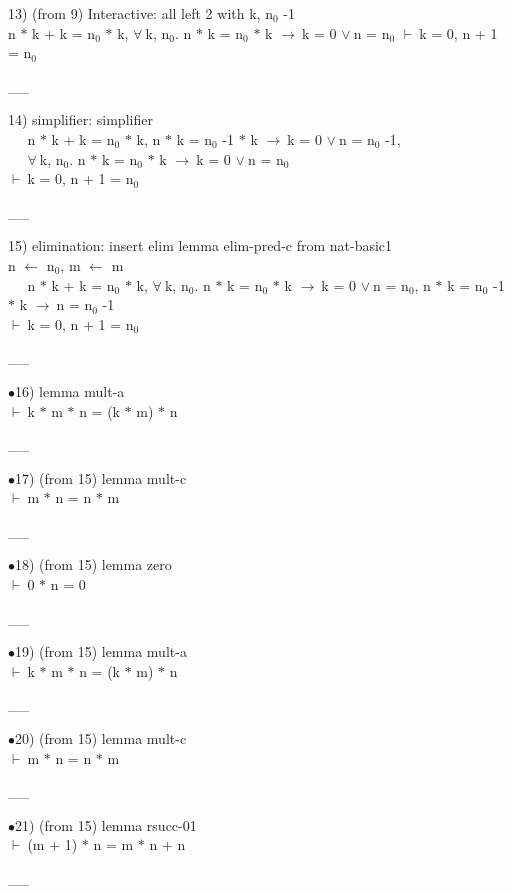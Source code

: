 \documentclass[a4paper]{article}
\newcommand{\Fol}{\mbox{$\vdash\ $}}
\newcommand{\Or}{\mbox{$\vee\ $}}
\newcommand{\Imp}{\mbox{$\rightarrow\ $}}
\newcommand{\All}{\mbox{$\forall\ $}}
\newcommand{\tabf}{\mbox{$\phantom{\vdash\ }$}}
\begin{document}
13)  (from 9) Interactive: all left  2 with k, $\mbox{n}_{0}$ -1\\
n $*$ k + k = $\mbox{n}_{0}$ $*$ k, \All k, $\mbox{n}_{0}$. n $*$ k = $\mbox{n}_{0}$ $*$ k \Imp k = 0 \Or n = $\mbox{n}_{0}$ \Fol k = 0, n + 1 = $\mbox{n}_{0}$

\vspace{-1.5ex}\_\hrulefill \_

14) simplifier: simplifier \\
\tabf n $*$ k + k = $\mbox{n}_{0}$ $*$ k, n $*$ k = $\mbox{n}_{0}$ -1 $*$ k \Imp k = 0 \Or n = $\mbox{n}_{0}$ -1, \\
 \tabf \All k, $\mbox{n}_{0}$. n $*$ k = $\mbox{n}_{0}$ $*$ k \Imp k = 0 \Or n = $\mbox{n}_{0}$ \\
\Fol k = 0, n + 1 = $\mbox{n}_{0}$

\vspace{-1.5ex}\_\hrulefill \_

15) elimination: insert elim lemma  elim-pred-c from nat-basic1\\
n $\leftarrow$ $\mbox{n}_{0}$, m $\leftarrow$ m\\
\tabf n $*$ k + k = $\mbox{n}_{0}$ $*$ k, \All k, $\mbox{n}_{0}$. n $*$ k = $\mbox{n}_{0}$ $*$ k \Imp k = 0 \Or n = $\mbox{n}_{0}$, n $*$ k = $\mbox{n}_{0}$ -1 $*$ k \Imp n = $\mbox{n}_{0}$ -1 \\
\Fol k = 0, n + 1 = $\mbox{n}_{0}$

\vspace{-1.5ex}\_\hrulefill \_

$\bullet$16) lemma mult-a \\
 \Fol k $*$ m $*$ n = (k $*$ m) $*$ n

\vspace{-1.5ex}\_\hrulefill \_

$\bullet$17)  (from 15) lemma mult-c \\
 \Fol m $*$ n = n $*$ m

\vspace{-1.5ex}\_\hrulefill \_

$\bullet$18)  (from 15) lemma zero \\
 \Fol 0 $*$ n = 0

\vspace{-1.5ex}\_\hrulefill \_

$\bullet$19)  (from 15) lemma mult-a \\
 \Fol k $*$ m $*$ n = (k $*$ m) $*$ n

\vspace{-1.5ex}\_\hrulefill \_

$\bullet$20)  (from 15) lemma mult-c \\
 \Fol m $*$ n = n $*$ m

\vspace{-1.5ex}\_\hrulefill \_

$\bullet$21)  (from 15) lemma rsucc-01 \\
 \Fol (m + 1) $*$ n = m $*$ n + n

\vspace{-1.5ex}\_\hrulefill \_
\end{document}
